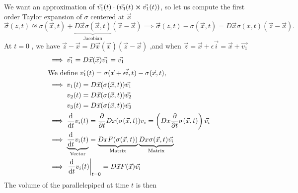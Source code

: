 \documentclass[
	12pt,
	]{article}
\theoremstyle{custom}
\theoremstyle{custom}
\theoremstyle{custom}
\theoremstyle{custom}
\theoremstyle{custom}
\theoremstyle{definition}
\theoremstyle{example}
\theoremstyle{note}
\theoremstyle{remark}
\theoremstyle{example}
\numberwithin{equation}{subsection}
\begin{document}
  				\noindent We want an approximation of $\vec{v_{1}}(t) \cdot (\vec{v_{3}}(t) \cross \vec{v_{1}}(t))$, so let us compute the first order Taylor expansion of $\sigma$ centered at $\vec{x}$
  				\begin{equation*}
  					\vec{\sigma}(z,t) \approxeq \sigma(\vec{x},t) + \underbrace{D\vec{x} \sigma(\vec{x},t)}_{\text{Jacobian}} (\vec{z}-\vec{x}) \implies 
  					\vec{\sigma}(z,t) - \sigma(\vec{x},t) = D\vec{x}\sigma (x,t)(\vec{z}-\vec{x}).
  				\end{equation*}
  					At $t=0$ , we have  $\vec{z} -\vec{x} = D\vec{x}(\vec{x})(\vec{z}-\vec{x})$ ,and when $\vec{z} = \vec{x} + \epsilon\vec{i} = \vec{x} + \vec{v_{1}}$ 
  				\begin{align*}
  				&\implies \vec{v_{1}} = D\vec{x}(\vec{x}) \vec{v_{1}} = \vec{v_{1}}\\
  				\intertext{We define $\vec{v_{1}}(t) = \sigma(\vec{x} + \epsilon \vec{i} , t) - \sigma(\vec{x},t), $}
  					&\implies v_{1}(t) = D \vec{x} (\sigma(\vec{x},t))\vec{v_{1}} \\
  					&\hphantom{\implies} \:\ v_{2}(t) = D\vec{x}(\sigma(\vec{x},t))\vec{v_{2}}\\
  					&\hphantom{\implies} \:\ v_{3}(t) = D\vec{x}(\sigma(\vec{x},t))\vec{v_{3}}\\
  					&\implies \dv{}{t}v_{i}(t) = \pdv{}{t}Dx (\sigma(\vec{x},t))v_{i} = \left(Dx \pdv{}{t}\sigma(\vec{x},t)\right)\vec{v_{i}}\\
  					&\implies \underbrace{\dv{}{t}v_{i}(t)}_{\text{Vector}} = \underbrace{Dx F(\sigma(\vec{x},t))}_{\text{Matrix}}\underbrace{Dx\sigma(\vec{x},t)\vec{v_{i}}}_{\text{Matrix}}\\
  					&\implies \eval{\dv{}{t}v_{i}(t)}_{t=0} = D\vec{x} F(\vec{x})\vec{v_{i}}
  				\end{align*}
  				The volume of the parallelepiped at time $t$ is then 
\end{document}
